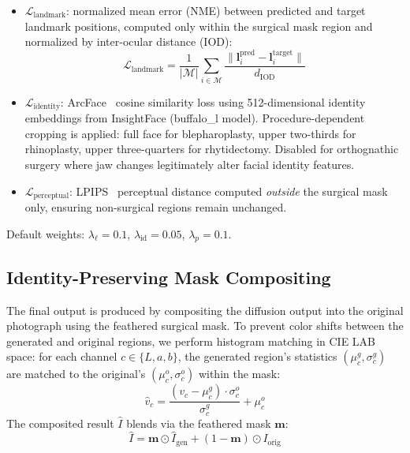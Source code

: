 \documentclass[runningheads]{llncs}
\begin{document}
\begin{itemize}
    \item $\mathcal{L}_\text{landmark}$: normalized mean error (NME)
    between predicted and target landmark positions, computed only within
    the surgical mask region and normalized by inter-ocular distance (IOD):
    \begin{equation}
    \mathcal{L}_\text{landmark} = \frac{1}{|\mathcal{M}|} \sum_{i \in \mathcal{M}}
    \frac{\|\mathbf{l}_i^\text{pred} - \mathbf{l}_i^\text{target}\|}{d_\text{IOD}}
    \end{equation}

    \item $\mathcal{L}_\text{identity}$: ArcFace~\cite{deng2019arcface}
    cosine similarity loss using 512-dimensional identity embeddings from
    InsightFace (buffalo\_l model).  Procedure-dependent cropping is
    applied: full face for blepharoplasty, upper two-thirds for
    rhinoplasty, upper three-quarters for rhytidectomy.  Disabled for
    orthognathic surgery where jaw changes legitimately alter facial
    identity features.

    \item $\mathcal{L}_\text{perceptual}$: LPIPS~\cite{zhang2018lpips}
    perceptual distance computed \emph{outside} the surgical mask only,
    ensuring non-surgical regions remain unchanged.
\end{itemize}

Default weights: $\lambda_\ell = 0.1$, $\lambda_\text{id} = 0.05$,
$\lambda_p = 0.1$.

\subsection{Identity-Preserving Mask Compositing}
\label{sec:compositing}

The final output is produced by compositing the diffusion output into the
original photograph using the feathered surgical mask.  To prevent color
shifts between the generated and original regions, we perform histogram
matching in CIE LAB space: for each channel $c \in \{L, a, b\}$, the
generated region's statistics $(\mu_c^g, \sigma_c^g)$ are matched to the
original's $(\mu_c^o, \sigma_c^o)$ within the mask:
\begin{equation}
\label{eq:color}
\hat{v}_c = \frac{(v_c - \mu_c^g) \cdot \sigma_c^o}{\sigma_c^g} + \mu_c^o
\end{equation}
The composited result $\hat{I}$ blends via the feathered mask $\mathbf{m}$:
\begin{equation}
\hat{I} = \mathbf{m} \odot \hat{I}_\text{gen} + (1 - \mathbf{m}) \odot I_\text{orig}
\end{equation}
\end{document}
